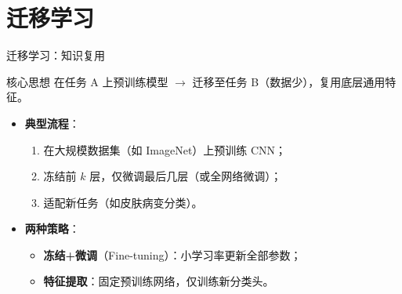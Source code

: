 \documentclass[t,aspectratio=169]{beamer} %
\begin{document}
\section{迁移学习}
\begin{frame}{迁移学习：知识复用}
\begin{block}{核心思想}
    在任务 A 上预训练模型 $\to$ 迁移至任务 B（数据少），复用底层通用特征。
\end{block}

\begin{itemize}
    \item \textbf{典型流程}：
        \begin{enumerate}
            \item 在大规模数据集（如 ImageNet）上预训练 CNN；
            \item 冻结前 $k$ 层，仅微调最后几层（或全网络微调）；
            \item 适配新任务（如皮肤病变分类）。
        \end{enumerate}
    \item \textbf{两种策略}：
        \begin{itemize}
            \item {\color{red}\textbf{冻结+微调}（Fine-tuning）}：小学习率更新全部参数；
            \item {\color{red}\textbf{特征提取}}：固定预训练网络，仅训练新分类头。
        \end{itemize}
\end{itemize}
\end{frame}

\end{document}
